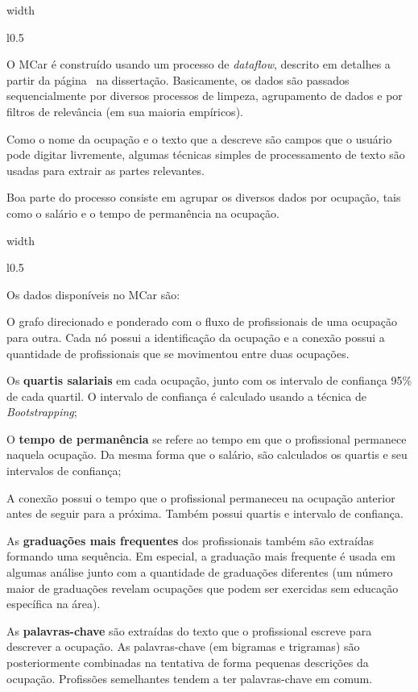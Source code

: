 \documentclass[10pt,a4paper,final]{article}
\newcommand\disappearingrule{%
  \par %
  \vskip10pt %
  \leaders\vrule width \textwidth\vskip0.4pt %
  \nointerlineskip %
  \vskip10pt %
}
\newenvironment{slideshort}[1]
{
  \disappearingrule
  
  \begin{minipage}[t][18\baselineskip]{\linewidth}
    \setlength{\parskip}{1ex}
    \begin{wrapfigure}{l}{0.5\textwidth}
      \includeslide[width=0.48\textwidth]{#1}
      \label{sde:#1}
    \end{wrapfigure}}
{\end{minipage}}
\newenvironment{slidelong}[1]
{
  \disappearingrule
  
  \begin{minipage}[t]{\linewidth}
    \setlength{\parskip}{1ex}
    \begin{wrapfigure}{l}{0.5\textwidth}
      \includeslide[width=0.48\textwidth]{#1}%
      \vspace{-0.8cm}
      \label{sde:#1}
    \end{wrapfigure}}
    {\end{minipage}}
\begin{document}
\begin{slideshort}{mapa-construcao}
  O MCar é construído usando um processo de \textit{dataflow}, descrito em detalhes a partir da página~\pageref{sec:construcao} na dissertação. Basicamente, os dados são passados sequencialmente por diversos processos de limpeza, agrupamento de dados e por filtros de relevância (em sua maioria empíricos).
  
  Como o nome da ocupação e o texto que a descreve são campos que o usuário pode digitar livremente, algumas técnicas simples de processamento de texto são usadas para extrair as partes relevantes.
  
  Boa parte do processo consiste em agrupar os diversos dados por ocupação, tais como o salário e o tempo de permanência na ocupação.
\end{slideshort}

\begin{slidelong}{mapa-dados}
  Os dados disponíveis no MCar são:

  O grafo direcionado e ponderado com o fluxo de profissionais de uma ocupação para outra. Cada nó possui a identificação da ocupação e a conexão possui a quantidade de profissionais que se movimentou entre duas ocupações.
  
  Os\textbf{ quartis salariais} em cada ocupação, junto com os intervalo de confiança 95\% de cada quartil. O intervalo de confiança é calculado usando a técnica de \textit{Bootstrapping};
  
  O \textbf{tempo de permanência} se refere ao tempo em que o profissional permanece naquela ocupação. Da mesma forma que o salário, são calculados os quartis e seu intervalos de confiança;
  
  A conexão possui o tempo que o profissional permaneceu na ocupação anterior antes de seguir para a próxima. Também possui quartis e intervalo de confiança.
  
  As \textbf{graduações mais frequentes} dos profissionais também são extraídas formando uma sequência. Em especial, a graduação mais frequente é usada em algumas análise junto com a quantidade de graduações diferentes (um número maior de graduações revelam ocupações que podem ser exercidas sem educação específica na área).
  
  As \textbf{palavras-chave} são extraídas do texto que o profissional escreve para descrever a ocupação. As palavras-chave (em bigramas e trigramas) são posteriormente combinadas na tentativa de forma pequenas descrições da ocupação. Profissões semelhantes tendem a ter palavras-chave em comum.
\end{slidelong}
\end{document}
